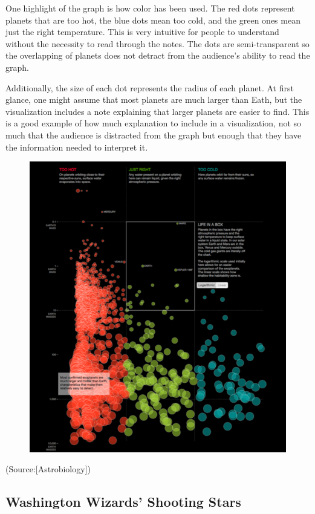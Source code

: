 \documentclass[]{book}
\theoremstyle{definition}
\theoremstyle{definition}
\theoremstyle{definition}
\theoremstyle{remark}
\begin{document}
One highlight of the graph is how color has been used. The red dots
represent planets that are too hot, the blue dots mean too cold, and the
green ones mean just the right temperature. This is very intuitive for
people to understand without the necessity to read through the notes.
The dots are semi-transparent so the overlapping of planets does not
detract from the audience's ability to read the graph.

Additionally, the size of each dot represents the radius of each planet.
At first glance, one might assume that most planets are much larger than
Eath, but the visualization includes a note explaining that larger
planets are easier to find. This is a good example of how much
explanation to include in a visualization, not so much that the audience
is distracted from the graph but enough that they have the information
needed to interpret it.

\begin{figure}
\centering
\includegraphics{images/planet.png}
\caption{}
\end{figure}

(Source:{[}Astrobiology{]})

\subsection{Washington Wizards' Shooting
Stars}\label{washington-wizards-shooting-stars}
\end{document}

